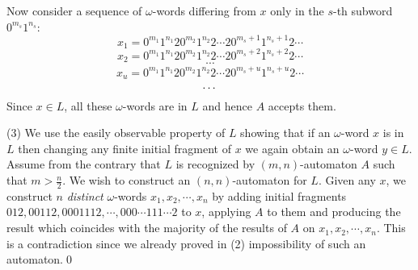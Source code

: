 \documentclass{llncs}
\begin{document}
Now consider a sequence of $\omega$-words differing from $x$ only in the $s$-th subword $0^{m_s}1^{n_s}$:
$$
x_1 = 0^{m_1}1^{n_1}20^{m_2}1^{n_2}2\cdots 20^{m_s+1}1^{n_s+1}2\cdots 
$$
$$
x_2 = 0^{m_1}1^{n_1}20^{m_2}1^{n_2}2\cdots 20^{m_s+2}1^{n_s+2}2\cdots 
$$
$$
\cdots 
$$
$$
x_u = 0^{m_1}1^{n_1}20^{m_2}1^{n_2}2\cdots 20^{m_s+u}1^{n_s+u}2\cdots 
$$
$$
\cdots \\
$$
Since $x \in L$, all these $\omega $-words are in $L$ and hence $A$ accepts them. 













\bigskip

(3) We use the easily observable property of $L$ showing that if an $\omega $-word $x$ is in $L$ then changing any finite initial fragment of $x$ we again obtain an $\omega $-word $y \in L$. Assume from the contrary that $L$ is recognized by  $(m,n)$-automaton $A$ such that $m > \frac{n}{2}$. We wish to construct an 
$(n,n)$-automaton for $L$. Given any $x$, we construct $n$ {\em distinct} $\omega $-words $x_1, x_2, \cdots , x_n$ by adding initial fragments
$012, 00112, 0001112, \cdots , 000\cdots 111\cdots 2$ to $x$, applying $A$ to them and producing the result which coincides with the majority of the results of
$A$ on $x_1, x_2, \cdots , x_n$. This is a contradiction since we already proved in (2) impossibility of such an automaton.\qed
\end{document}
